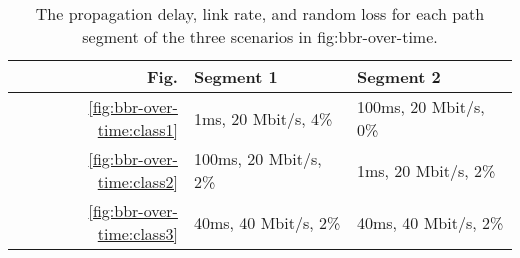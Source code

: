 \begin{table}[t!]
  \centering
\begin{tabular}{ r l l }
  \toprule
    \textbf{Fig.} & \textbf{Segment 1} & \textbf{Segment 2} \\
    \midrule
    \ref{fig:bbr-over-time:class1} & 1ms, 20 Mbit/s, 4\% & 100ms, 20 Mbit/s, 0\% \\
    \ref{fig:bbr-over-time:class2} & 100ms, 20 Mbit/s, 2\% & 1ms, 20 Mbit/s, 2\%\\
    \ref{fig:bbr-over-time:class3} & 40ms, 40 Mbit/s, 2\% & 40ms, 40 Mbit/s, 2\%\\
\bottomrule
\end{tabular}
  \caption{\label{tab:network-setting-params} The propagation delay, link rate,
   and random loss for each path segment of the three scenarios in \Cref
   {fig:bbr-over-time}. }
\end{table}
